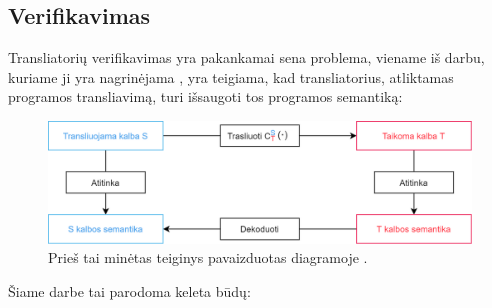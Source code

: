 \documentclass{VUMIFPSkursinis}
\begin{document}
\subsection{Verifikavimas}
Transliatorių verifikavimas yra pakankamai sena problema, viename iš darbu, kuriame ji yra nagrinėjama \cite{compilerCorrectness}, yra teigiama, kad transliatorius, atliktamas programos transliavimą, turi išsaugoti tos programos semantiką:
\begin{figure}[H]
	\centering
	\includegraphics[scale=0.85]{corect.png}
	\caption{Prieš tai minėtas teiginys pavaizduotas diagramoje \cite{compilerCorrectness}.}
	\centering
	\end{figure}
	 Šiame darbe tai parodoma keleta būdų:
\end{document}
